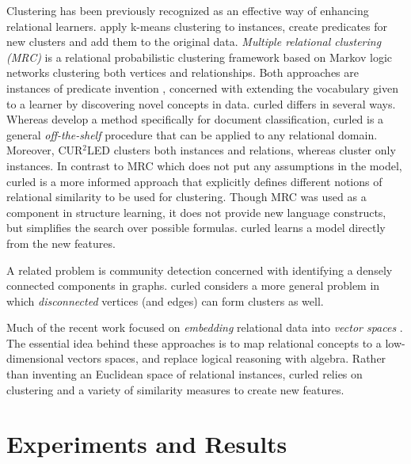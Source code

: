 Clustering has been previously recognized as an effective way of enhancing relational learners.
\cite{Popescul2004}  apply k-means clustering to instances, create predicates for new clusters and add them to the original data.
\textit{Multiple relational clustering (MRC)} \cite{Kok2007,Kok2008} is a relational probabilistic clustering framework based on Markov logic networks \cite{Richardson2006} clustering both vertices and relationships. 
Both approaches are instances of predicate invention \cite{Kramer1995,Craven2001}, concerned with extending the vocabulary given to a learner by discovering novel concepts in data.
\gls{curled} differs in several ways.
Whereas \cite{Popescul2004} develop a method specifically  for document classification, \gls{curled} is a general \textit{off-the-shelf} procedure that can be applied to any relational domain.
Moreover, CUR$^2$LED clusters both instances and relations, whereas \cite{Popescul2004} cluster only instances.
In contrast to MRC which does not put any assumptions in the model, \gls{curled} is a more informed approach that explicitly defines different notions of relational similarity to be used for clustering.
Though MRC was used as a component in structure learning, it does not provide new language constructs, but simplifies the search over possible formulas.
\gls{curled} learns a model directly from the new features.


A related problem is community detection \cite{Karypis:1998:FHQ:305219.305248,Fortunato201075} concerned with identifying a densely connected components in graphs.
\gls{curled} considers a more general problem in which \textit{disconnected} vertices (and edges) can form clusters as well.


Much of the recent work focused on  \textit{embedding} relational data into \textit{vector spaces} \cite{Nickel0TG16,DBLP:conf/nips/Niepert16,Bordes:2011:LSE,Bordes:2013:TEM,DBLP:conf/icml/NiepertAK16}.
The essential idea behind these approaches is to map relational concepts to a low-dimensional vectors spaces, and replace logical reasoning with algebra.
Rather than inventing an Euclidean space of relational instances, \gls{curled} relies on clustering and a variety of similarity measures to create new features.


\section{Experiments and Results}
\label{sec:Results}

